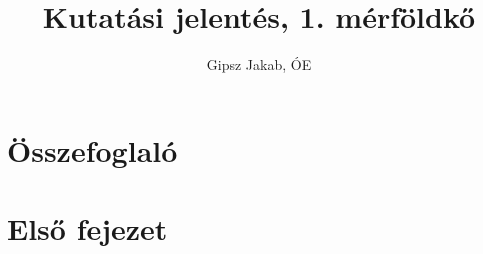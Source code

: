 \documentclass[a4paper,12pt]{report}
\title{Kutatási jelentés, 1. mérföldkő}
\author{Gipsz Jakab, ÓE}
\theoremstyle{definition}
\begin{document}
\makepreamble
\chapter{Összefoglaló}


\chapter{Első fejezet}
\end{document}
